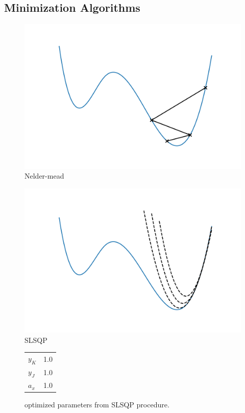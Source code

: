 \subsection{Minimization Algorithms}
\label{subsec:algorithms}

\begin{figure}
    \includegraphics{nelder-mead.png}
    \caption{Nelder-mead}
\end{figure}

\begin{figure}
    \includegraphics{SLSQP.png}
    \caption{SLSQP}
\end{figure}


\begin{figure}
    \centering
    \begin{tabular}{l | r}
        \hline
        $y_K$ & 1.0 \\
        $y_J$ & 1.0 \\
        $a_x$ & 1.0 \\
        \hline
    \end{tabular}
    \caption{optimized parameters from SLSQP procedure.}
    \centering
\end{figure}

